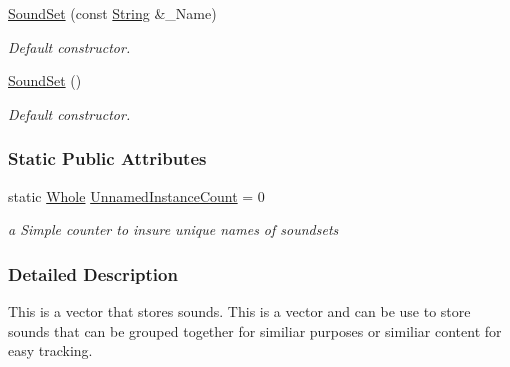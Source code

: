 \begin{DoxyCompactItemize}
\item 
\hypertarget{classphys_1_1SoundSet_a3237068484b781ed267cc41050cd6628}{
\hyperlink{classphys_1_1SoundSet_a3237068484b781ed267cc41050cd6628}{SoundSet} (const \hyperlink{namespacephys_aa03900411993de7fbfec4789bc1d392e}{String} \&\_\-Name)}
\label{classphys_1_1SoundSet_a3237068484b781ed267cc41050cd6628}

\begin{DoxyCompactList}\small\item\em Default constructor. \item\end{DoxyCompactList}\item 
\hypertarget{classphys_1_1SoundSet_a87c99d3ef6cda1b6183edc3320636abb}{
\hyperlink{classphys_1_1SoundSet_a87c99d3ef6cda1b6183edc3320636abb}{SoundSet} ()}
\label{classphys_1_1SoundSet_a87c99d3ef6cda1b6183edc3320636abb}

\begin{DoxyCompactList}\small\item\em Default constructor. \item\end{DoxyCompactList}\end{DoxyCompactItemize}
\subsubsection*{Static Public Attributes}
\begin{DoxyCompactItemize}
\item 
\hypertarget{classphys_1_1SoundSet_aaa6e07be3d7ce9b9b8b3dd86e8ca95e9}{
static \hyperlink{namespacephys_a460f6bc24c8dd347b05e0366ae34f34a}{Whole} \hyperlink{classphys_1_1SoundSet_aaa6e07be3d7ce9b9b8b3dd86e8ca95e9}{UnnamedInstanceCount} = 0}
\label{classphys_1_1SoundSet_aaa6e07be3d7ce9b9b8b3dd86e8ca95e9}

\begin{DoxyCompactList}\small\item\em a Simple counter to insure unique names of soundsets \item\end{DoxyCompactList}\end{DoxyCompactItemize}


\subsubsection{Detailed Description}
This is a vector that stores sounds. This is a vector and can be use to store sounds that can be grouped together for similiar purposes or similiar content for easy tracking. 

